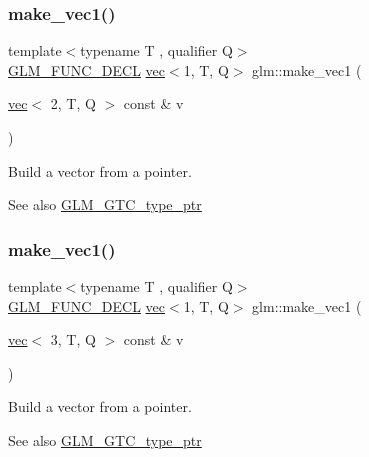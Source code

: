 \subsubsection{\texorpdfstring{make\+\_\+vec1()}{make\_vec1()}\hspace{0.1cm}{\footnotesize\ttfamily [2/4]}}
{\footnotesize\ttfamily template$<$typename T , qualifier Q$>$ \\
\mbox{\hyperlink{setup_8hpp_ab2d052de21a70539923e9bcbf6e83a51}{G\+L\+M\+\_\+\+F\+U\+N\+C\+\_\+\+D\+E\+CL}} \mbox{\hyperlink{structglm_1_1vec}{vec}}$<$1, T, Q$>$ glm\+::make\+\_\+vec1 (\begin{DoxyParamCaption}\item[{\mbox{\hyperlink{structglm_1_1vec}{vec}}$<$ 2, T, Q $>$ const \&}]{v }\end{DoxyParamCaption})\hspace{0.3cm}{\ttfamily [inline]}}

Build a vector from a pointer. \begin{DoxySeeAlso}{See also}
\mbox{\hyperlink{group__gtc__type__ptr}{G\+L\+M\+\_\+\+G\+T\+C\+\_\+type\+\_\+ptr}} 
\end{DoxySeeAlso}
\mbox{\label{group__gtc__type__ptr_ga3c23cc74086d361e22bbd5e91a334e03}} 
\subsubsection{\texorpdfstring{make\+\_\+vec1()}{make\_vec1()}\hspace{0.1cm}{\footnotesize\ttfamily [3/4]}}
{\footnotesize\ttfamily template$<$typename T , qualifier Q$>$ \\
\mbox{\hyperlink{setup_8hpp_ab2d052de21a70539923e9bcbf6e83a51}{G\+L\+M\+\_\+\+F\+U\+N\+C\+\_\+\+D\+E\+CL}} \mbox{\hyperlink{structglm_1_1vec}{vec}}$<$1, T, Q$>$ glm\+::make\+\_\+vec1 (\begin{DoxyParamCaption}\item[{\mbox{\hyperlink{structglm_1_1vec}{vec}}$<$ 3, T, Q $>$ const \&}]{v }\end{DoxyParamCaption})\hspace{0.3cm}{\ttfamily [inline]}}

Build a vector from a pointer. \begin{DoxySeeAlso}{See also}
\mbox{\hyperlink{group__gtc__type__ptr}{G\+L\+M\+\_\+\+G\+T\+C\+\_\+type\+\_\+ptr}} 
\end{DoxySeeAlso}
\mbox{\label{group__gtc__type__ptr_ga6af06bb60d64ca8bcd169e3c93bc2419}} 
